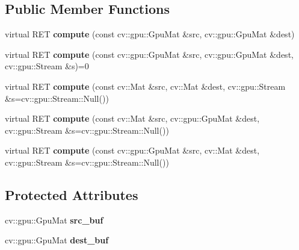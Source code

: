 \subsection*{Public Member Functions}
\begin{DoxyCompactItemize}
\item 
\hypertarget{classskl_1_1gpu_1_1_filter_gpu_mat2_gpu_mat_a0189451d4a1cdf732b527baec5ec3419}{}\label{classskl_1_1gpu_1_1_filter_gpu_mat2_gpu_mat_a0189451d4a1cdf732b527baec5ec3419} 
virtual R\+ET {\bfseries compute} (const cv\+::gpu\+::\+Gpu\+Mat \&src, cv\+::gpu\+::\+Gpu\+Mat \&dest)
\item 
\hypertarget{classskl_1_1gpu_1_1_filter_gpu_mat2_gpu_mat_a86966fac0c2622d3856671f167a5fa7b}{}\label{classskl_1_1gpu_1_1_filter_gpu_mat2_gpu_mat_a86966fac0c2622d3856671f167a5fa7b} 
virtual R\+ET {\bfseries compute} (const cv\+::gpu\+::\+Gpu\+Mat \&src, cv\+::gpu\+::\+Gpu\+Mat \&dest, cv\+::gpu\+::\+Stream \&s)=0
\item 
\hypertarget{classskl_1_1gpu_1_1_filter_gpu_mat2_gpu_mat_a85d4ba1e609b020fa3a27d540b0d9915}{}\label{classskl_1_1gpu_1_1_filter_gpu_mat2_gpu_mat_a85d4ba1e609b020fa3a27d540b0d9915} 
virtual R\+ET {\bfseries compute} (const cv\+::\+Mat \&src, cv\+::\+Mat \&dest, cv\+::gpu\+::\+Stream \&s=cv\+::gpu\+::\+Stream\+::\+Null())
\item 
\hypertarget{classskl_1_1gpu_1_1_filter_gpu_mat2_gpu_mat_acff099208f52a6a0da328d1b9e02b711}{}\label{classskl_1_1gpu_1_1_filter_gpu_mat2_gpu_mat_acff099208f52a6a0da328d1b9e02b711} 
virtual R\+ET {\bfseries compute} (const cv\+::\+Mat \&src, cv\+::gpu\+::\+Gpu\+Mat \&dest, cv\+::gpu\+::\+Stream \&s=cv\+::gpu\+::\+Stream\+::\+Null())
\item 
\hypertarget{classskl_1_1gpu_1_1_filter_gpu_mat2_gpu_mat_a874f7fcf98ec9ab35cd0529d53b1d80f}{}\label{classskl_1_1gpu_1_1_filter_gpu_mat2_gpu_mat_a874f7fcf98ec9ab35cd0529d53b1d80f} 
virtual R\+ET {\bfseries compute} (const cv\+::gpu\+::\+Gpu\+Mat \&src, cv\+::\+Mat \&dest, cv\+::gpu\+::\+Stream \&s=cv\+::gpu\+::\+Stream\+::\+Null())
\end{DoxyCompactItemize}
\subsection*{Protected Attributes}
\begin{DoxyCompactItemize}
\item 
\hypertarget{classskl_1_1gpu_1_1_filter_gpu_mat2_gpu_mat_a8b15362578aa443b6ccbb809cf4c2437}{}\label{classskl_1_1gpu_1_1_filter_gpu_mat2_gpu_mat_a8b15362578aa443b6ccbb809cf4c2437} 
cv\+::gpu\+::\+Gpu\+Mat {\bfseries src\+\_\+buf}
\item 
\hypertarget{classskl_1_1gpu_1_1_filter_gpu_mat2_gpu_mat_a0f2b8b38655cb0aaf695e7b58f67b49b}{}\label{classskl_1_1gpu_1_1_filter_gpu_mat2_gpu_mat_a0f2b8b38655cb0aaf695e7b58f67b49b} 
cv\+::gpu\+::\+Gpu\+Mat {\bfseries dest\+\_\+buf}
\end{DoxyCompactItemize}


